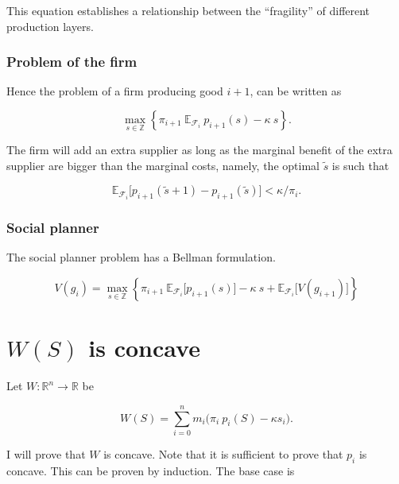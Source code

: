 \documentclass[american, abstract=on]{scrartcl}
\renewcommand{\Re}{\mathbb{R}}
\newcommand{\F}{\mathcal{F}}
\newcommand{\E}{\mathbb{E}}
\begin{document}
This equation establishes a relationship between the ``fragility'' of different production layers.


\subsubsection{Problem of the firm}

Hence the problem of a firm producing good $i + 1$, can be written as

\begin{equation}
  \max_{s \in \mathbb{Z}} \left\{ \pi_{i+1} \ \E_{\F_i} \ p_{i+1}(s) - \kappa \ s \right\}.
\end{equation}

The firm will add an extra supplier as long as the marginal benefit of the extra supplier are bigger than the marginal costs, namely, the optimal $\tilde{s}$ is such that

\begin{equation}
  \E_{\F_i} \Big[ p_{i+1}(\tilde{s} + 1 ) - p_{i+1}(\tilde{s})  \Big] < \kappa / \pi_i.
\end{equation}

\subsubsection{Social planner}

The social planner problem has a Bellman formulation.

\begin{equation}
  V(g_i) = \max_{s \in \mathbb{Z}} \left\{ \pi_{i+1} \ \E_{\F_i} \Big[ p_{i+1}(s) \Big] - \kappa \ s + \E_{\F_i}\Big[  V(g_{i+1})\Big] \right\}
\end{equation}


\newpage
\nocite{*}
\printbibliography

\newpage
\appendix
\section[Concavity of social planner problem]{$W(S)$ is concave}

Let $W: \Re^n \to \Re$ be

\begin{equation}
  W(S) = \sum^n_{i = 0} m_i \Big( \pi_i \ p_i(S) - \kappa s_i \Big).
\end{equation}

I will prove that $W$ is concave. Note that it is sufficient to prove that $p_i$ is concave. This can be proven by induction. The base case is 
\end{document}
